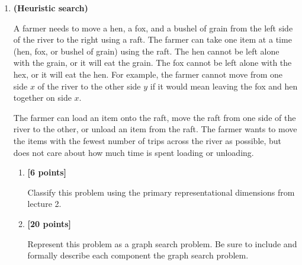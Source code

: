 \documentclass{article}
\newcounter{totalpoints}
\newcommand{\points}[1]{{\addtocounter{totalpoints}{#1}\textbf{[#1 points]}}}
\begin{document}
\begin{enumerate}
\begin{enumerate}
\begin{answer}{1in}
\end{answer}

\item \points{5}
List the paths that are removed from the frontier by a least cost first search of the problem you specified in part~(\ref{q:uninformed-graph}), \textbf{in the order in which they are removed}.

\begin{answer}{1in}
\end{answer}

\end{enumerate}

\item \textbf{(Heuristic search)}

A farmer needs to move a hen, a fox, and a bushel of grain from the left side of the river to the right using a raft.
The farmer can take one item at a time (hen, fox, or bushel of grain) using the raft.
The hen cannot be left alone with the grain, or it will eat the grain.
The fox cannot be left alone with the hex, or it will eat the hen.
For example, the farmer cannot move from one side $x$ of the river to the other side $y$ if it would mean leaving the fox and hen together on side $x$.

The farmer can load an item onto the raft, move the raft from one side of the river to the other, or unload an item from the raft.  The farmer wants to move the items with the fewest number of trips across the river as possible, but does not care about how much time is spent loading or unloading.

\begin{enumerate}
\item \points{6} Classify this problem using the primary representational dimensions from lecture 2.

\begin{answer}{.5in}
\end{answer}

\item \points{20} \label{q:construct-rep}
Represent this problem as a graph search problem.
Be sure to include and formally describe each component the graph search problem.

\begin{answer}{2.5in}
\end{answer}


\end{enumerate}
\end{enumerate}
\end{document}
